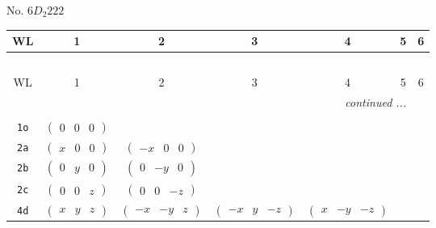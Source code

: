 \documentclass[fleqn,9pt,landscape]{jsarticle}
\begin{document}
\newpage
No. 6\quad$D_{2}$\quad$222$\quad[ orthorhombic ]
\begin{center}
\renewcommand{\arraystretch}{1.2}
\begin{longtable}{ccccccc}
 \hline \hline
WL & 1 & 2 & 3 & 4 & 5 & 6 \\ \hline \endfirsthead

\multicolumn{6}{l}{\tablename\ \thetable{}} \\
 \hline \hline
WL & 1 & 2 & 3 & 4 & 5 & 6 \\ \hline \endhead

 \hline \hline
\multicolumn{6}{r}{\footnotesize\it continued ...} \\ \endfoot

 \hline \hline
\multicolumn{6}{r}{} \\ \endlastfoot

{\tt 1o} & $ \begin{pmatrix} 0 & 0 & 0 \end{pmatrix} $ & $  $ & $  $ & $  $ \\ \hline
{\tt 2a} & $ \begin{pmatrix} x & 0 & 0 \end{pmatrix} $ & $ \begin{pmatrix} - x & 0 & 0 \end{pmatrix} $ & $  $ & $  $ \\ \hline
{\tt 2b} & $ \begin{pmatrix} 0 & y & 0 \end{pmatrix} $ & $ \begin{pmatrix} 0 & - y & 0 \end{pmatrix} $ & $  $ & $  $ \\ \hline
{\tt 2c} & $ \begin{pmatrix} 0 & 0 & z \end{pmatrix} $ & $ \begin{pmatrix} 0 & 0 & - z \end{pmatrix} $ & $  $ & $  $ \\ \hline
{\tt 4d} & $ \begin{pmatrix} x & y & z \end{pmatrix} $ & $ \begin{pmatrix} - x & - y & z \end{pmatrix} $ & $ \begin{pmatrix} - x & y & - z \end{pmatrix} $ & $ \begin{pmatrix} x & - y & - z \end{pmatrix} $ \\
\end{longtable}
\end{center}
\end{document}
